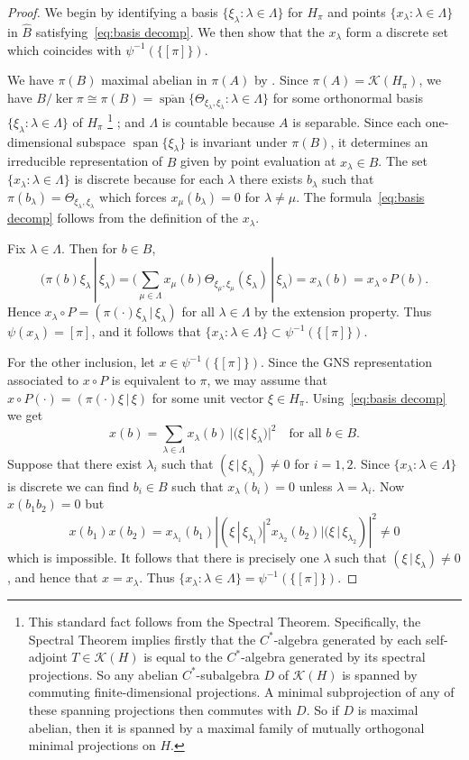 \documentclass[12pt,a4paper]{amsart}
\newcommand{\Kk}{\mathcal{K}}
\newcommand{\lsp}{\operatorname{span}}
\newcommand{\clsp}{\overline{\lsp}}
\newcommand{\Hh}{{H}}
\begin{document}
\begin{proof}
We begin by identifying a basis $\{\xi_\lambda : \lambda \in
\Lambda\}$ for $H_\pi$ and points $\{x_\lambda : \lambda \in
\Lambda\}$ in $\widehat{B}$ satisfying~\eqref{eq:basis decomp}.
We then show that the $x_\lambda$ form a discrete set which
coincides with $\psi^{-1}(\{[\pi]\})$.

We have $\pi(B)$ maximal abelian in $\pi(A)$ by
\cite[Corollary~3.2]{ABG}. Since $\pi(A)=\Kk(H_\pi)$, we have
$B/\ker\pi\cong \pi(B) =
\clsp\{\Theta_{\xi_\lambda,\xi_\lambda} : \lambda \in
\Lambda\}$ for some orthonormal basis $\{\xi_\lambda : \lambda \in
\Lambda\}$ of $\Hh_\pi$
%
\footnote{This standard fact follows from the Spectral Theorem. Specifically, the Spectral Theorem implies firstly that the $C^*$-algebra generated by each self-adjoint $T \in \Kk(H)$ is equal to the $C^*$-algebra generated by its spectral projections. So any abelian $C^*$-subalgebra $D$ of $\Kk(H)$ is spanned by commuting finite-dimensional projections. A minimal subprojection of any of these spanning projections then commutes with $D$. So if $D$ is maximal abelian, then it is spanned by a maximal family of mutually orthogonal minimal projections on $H$.}%
%
; and $\Lambda$ is countable because $A$
is separable. Since each one-dimensional subspace $\lsp\{\xi_\lambda\}$ is
invariant under $\pi(B)$, it determines an irreducible
representation of $B$ given by point evaluation at
$x_\lambda \in \widehat{B}$. The set $\{x_\lambda : \lambda \in
\Lambda\}$ is discrete because for each $\lambda$ there exists
$b_\lambda$ such that $\pi(b_\lambda) =
\Theta_{\xi_\lambda,\xi_\lambda}$ which forces
$x_\mu(b_\lambda) = 0$ for $\lambda \not= \mu$. The formula~\eqref{eq:basis decomp}
follows from the definition of the $x_\lambda$.

Fix $\lambda \in \Lambda$. Then for $b \in B$,
\[
(\pi(b)\xi_\lambda\,|\,\xi_\lambda)=
\Big(\sum_{\mu \in \Lambda} x_\mu(b)\Theta_{\xi_\mu,\xi_\mu}(\xi_\lambda)\,|\,\xi_\lambda\Big)
=x_\lambda(b)=x_\lambda\circ P(b).
\]
Hence $x_\lambda\circ P=
(\pi(\cdot)\xi_\lambda\,|\,\xi_\lambda)$ for all $\lambda \in
\Lambda$ by the extension property. Thus
$\psi(x_\lambda) = [\pi]$, and it follows that $\{x_\lambda :
\lambda \in \Lambda\}\subset\psi^{-1}(\{[\pi]\})$.

For the other inclusion, let $x\in \psi^{-1}(\{[\pi]\})$. Since the GNS representation associated to $x\circ P$ is equivalent to $\pi$, we may assume that $x\circ P(\cdot)=(\pi(\cdot)\xi\,|\,\xi)$ for some unit vector $\xi\in H_\pi$. Using~\eqref{eq:basis decomp} we get
\[
x(b)=\sum_{\lambda\in\Lambda} x_\lambda(b)\, |(\xi\,|\, \xi_\lambda)|^2\quad\text{for all $b\in B$.}
\]
Suppose that there exist $\lambda_i$ such that $(\xi\,|\, \xi_{\lambda_i})\neq 0$ for $i=1,2$.  Since $\{x_\lambda : \lambda \in
\Lambda\}$ is discrete we can find $b_i\in B$ such that $x_\lambda(b_i)=0$ unless $\lambda=\lambda_i$.  Now $x(b_1b_2)=0$ but
\[x(b_1)x(b_2)=x_{\lambda_1}(b_1)|(\xi\,|\, \xi_{\lambda_1})|^2x_{\lambda_2}(b_2)|(\xi\,|\, \xi_{\lambda_2})|^2\neq 0
\]
which is impossible.  It follows that there is precisely one $\lambda$ such that $(\xi\,|\, \xi_{\lambda})\neq 0$, and hence that $x=x_\lambda$. Thus $\{x_\lambda : \lambda \in \Lambda\}=\psi^{-1}(\{[\pi]\})$.



\end{proof}
\end{document}
